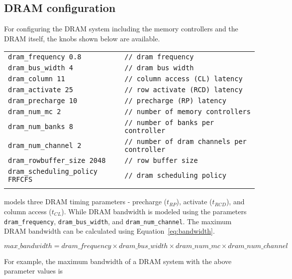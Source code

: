 \subsection{DRAM configuration}
\label{sec:param-dram}

For configuring the DRAM system including the memory controllers and the DRAM
itself, the knobs shown below are available. 

\begin{tabular}{l l}
 \\
 \Verb+dram_frequency 0.8+ & \Verb+// dram frequency+ \\
 \Verb+dram_bus_width 4 + & \Verb+// dram bus width+ \\
 \Verb+dram_column 11+ & \Verb+// column access (CL) latency+ \\
 \Verb+dram_activate 25 + & \Verb+// row activate (RCD) latency+ \\
 \Verb+dram_precharge 10+ & \Verb+// precharge (RP) latency+ \\
 \Verb+dram_num_mc 2 + & \Verb+// number of memory controllers+ \\
 \Verb+dram_num_banks 8+ & \Verb+// number of banks per controller+ \\
 \Verb+dram_num_channel 2 + & \Verb+// number of dram channels per controller+ \\
 \Verb+dram_rowbuffer_size 2048 + & \Verb+// row buffer size+ \\
 \Verb+dram_scheduling_policy FRFCFS+ & \Verb+// dram scheduling policy+ \\
 \\
\end{tabular}

\noindent \SIM models three DRAM timing parameters - precharge ($t_{RP}$), activate
($t_{RCD}$), and column access ($t_{CL}$). While DRAM bandwidth is modeled using the
parameters \Verb+dram_frequency+, \Verb+dram_bus_width+, and
\Verb+dram_num_channel+. The maximum DRAM bandwidth can be calculated using
Equation~\ref{eq:bandwidth}. 

\begin{equation}
\label{eq:bandwidth}
max\_bandwidth = dram\_frequency \times dram\_bus\_width \times dram\_num\_mc \times dram\_num\_channel 
\end{equation}

\noindent For example, the maximum bandwidth of a DRAM system with the above parameter
values is

